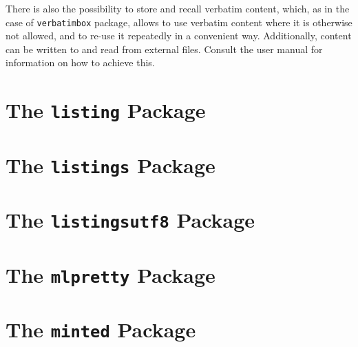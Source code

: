 \documentclass[article,a4paper,oneside,10pt]{memoir}
\newcommand\code[1]{\texttt{#1}}
\begin{document}
There is also the possibility to  store and recall verbatim content, which, as
in  the case  of \code{verbatimbox}  package, allows  to use  verbatim content
where it is otherwise not allowed, and to re-use it repeatedly in a convenient
way.   Additionally,  content  can  be  written  to  and  read  from  external
files. Consult the user manual for information on how to achieve this.


\newpage
\chapter{The \code{listing} Package \cite{listing}}
\label{chap:listing}


\chapter{The \code{listings}      Package \cite{listings}}
\label{chap:listings}


\chapter{The \code{listingsutf8}  Package \cite{listingsutf8}}
\label{chap:listingsutf8}


\chapter{The \code{mlpretty}      Package \cite{mlpretty}}
\label{chap:mlpretty}


\chapter{The \code{minted}        Package \cite{minted}}
\label{chap:minted}
\end{document}

